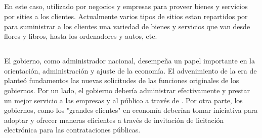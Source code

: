 
\subsection{\btoc}

En este caso, \internet utilizado por negocios y empresas para proveer bienes y servicios por sities \web a los clientes. Actualmente varios tipos de sitios \web \btoc estan repartidos por \internet para suministrar a los clientes una variedad de bienes y servicios que van desde flores y libros, hasta los ordenadores y autos, etc.

\subsection{\btog}

El gobierno, como administrador nacional, desempeña un papel importante en la orientación, administración y ajuste de la economía. El advenimiento de la era de \ecommerce planteó fundamentos \ecommerce las nuevas solicitudes de las funciones originales de los gobiernos. Por un lado, el gobierno debería  administrar \emarket efectivamente y prestar un mejor servicio a las empresas y al público a través de \egoverment. Por otra parte, los gobiernos, como los "grandes clientes" en economía deberían tomar iniciativa para adoptar \ecommerce y ofrecer maneras eficientes a través de invitación de licitación electrónica para las contrataciones públicas.


\subsection{\gtog}



